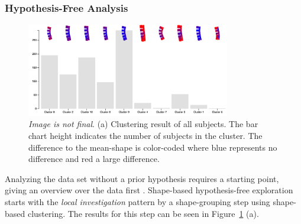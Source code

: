 \documentclass[journal]{style/vgtc} 			          %
\begin{document}
\subsubsection{Hypothesis-Free Analysis} \label{Hypothesis free Analysis}
\begin{figure}[htb]
 \centering
 \includegraphics[width=3.5in]{figures/hypothesisfree}
 \caption{\emph{Image is not final}. (a) Clustering result of all subjects. The bar chart height indicates the number of subjects in the cluster. The difference to the mean-shape is color-coded where blue represents no difference and red a large difference.}
 \label{fig:hypothesisfree}
\end{figure}
%
Analyzing the data set without a prior hypothesis requires a starting point, giving an overview over the data first \cite{Shneiderman1996}.
%
Shape-based hypothesis-free exploration starts with the \emph{local investigation} pattern by a shape-grouping step using shape-based clustering.
%
The results for this step can be seen in Figure~\ref{fig:hypothesisfree} (a).
\end{document}
